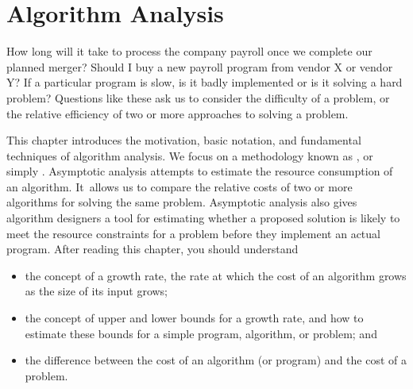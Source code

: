 
\chapter{Algorithm Analysis}
\label{AlgAnal}
\def\CHHEAD{Chap.\ \thechapter\ Algorithm Analysis}    %


How long will it take to process the company payroll once we complete
our planned merger?
Should I buy a new payroll program from vendor X or vendor Y?
If a particular program is slow, is it badly implemented or is it
solving a hard problem?
Questions like these ask us to consider the difficulty of a problem,
or the relative efficiency of two or more approaches to solving a
problem.

This chapter introduces the motivation, basic notation, and
fundamental techniques of algorithm analysis.
We focus on a methodology known as
, or simply
.
Asymptotic analysis attempts to estimate the resource
consumption of an algorithm.
It~allows us to compare the relative costs of two or more
algorithms for solving the same problem.
Asymptotic analysis also gives algorithm designers a tool for
estimating whether a proposed solution is likely to meet the resource
constraints for a problem before they implement an actual
program.
After reading this chapter, you should understand

\begin{itemize}
\item
the concept of a growth rate,
the rate at which the cost of an algorithm grows
as the size of its input grows;

\item
{}
the concept of upper and lower bounds for a
growth rate, and how to estimate these bounds for a simple program,
algorithm, or problem; and

\item
the difference between the cost of an algorithm
(or program) and the cost of a problem.
\end{itemize}


